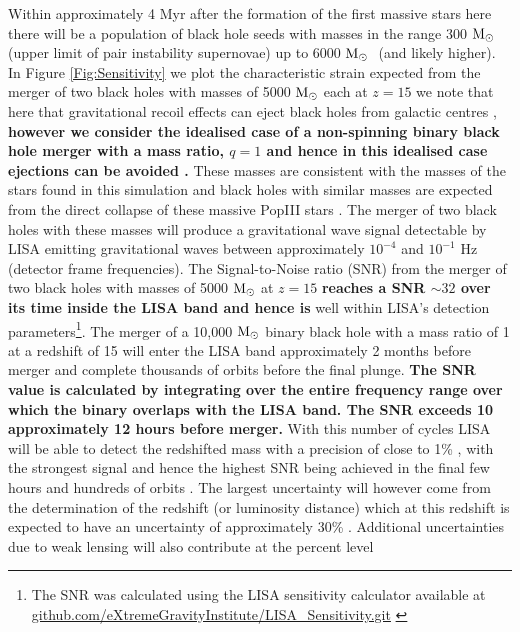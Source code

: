 \documentclass[twocolumn,iop,revtex4]{openjournal}
\newcommand{\msolar} {$\rm{M_{\odot}}~$}
\begin{document}
\noindent Within approximately 4 Myr after the formation of the first massive stars here there
will be a population of black hole seeds with masses in the range 300 \msolar (upper limit of pair
instability supernovae) up to 6000 \msolar
(and likely higher). In Figure \ref{Fig:Sensitivity} we plot the characteristic strain
expected from the merger of two black holes with masses of 5000 \msolar each at $z = 15$
we note that here that gravitational recoil effects can eject black holes from galactic
centres \citep[e.g.][]{Gultekin_2006}, \textbf{however we consider the idealised case of a non-spinning
  binary black hole merger with a mass ratio, $q = 1$ and hence in this
  idealised case ejections
  can be avoided \citep{Holley-Bockelmann_2008, Morawski_2018, Dunn_2020}.}
These masses are consistent with the masses of the stars found in this simulation and black holes
with similar masses are expected from the direct collapse of these massive PopIII
stars \citep{Heger_2003}. The merger of two black holes with these masses will produce a
gravitational wave signal detectable by LISA \citep{eLISA, Sesana_2016, Cornish_2020} emitting
gravitational waves between approximately $10^{-4}$ and $10^{-1}$ Hz (detector frame frequencies). The
Signal-to-Noise ratio (SNR) from the merger of two black holes with masses of 5000 \msolar at $z = 15$
\textbf{reaches a SNR $\sim 32$ over its time inside the LISA band and hence is}
well within LISA's detection parameters\footnote{The SNR was calculated
  using the LISA sensitivity calculator available at
  \url{github.com/eXtremeGravityInstitute/LISA_Sensitivity.git} \citep{Robson_2019}}.
The merger of a 10,000 \msolar binary black hole with a mass ratio of 1 at a redshift of 15
will enter the LISA band approximately 2 months before merger and complete
thousands of orbits before the final plunge. \textbf{The SNR value is calculated by integrating
  over the entire frequency range over which the binary overlaps with the LISA band. The
SNR exceeds 10 approximately 12 hours before merger.}
With this number of cycles LISA will be able to detect
the redshifted mass with a precision of close to 1\% \citep{Sesana_2013}, with the
  strongest signal and hence the highest SNR being achieved in the final few hours and
  hundreds of orbits \citep{Robson_2019}. The largest uncertainty
will however come from the determination of the redshift (or luminosity distance) which at this
redshift is expected to have an uncertainty of approximately 30\% \citep{Sesana_2013}. Additional
uncertainties due to weak lensing will also contribute at the percent level
\end{document}
